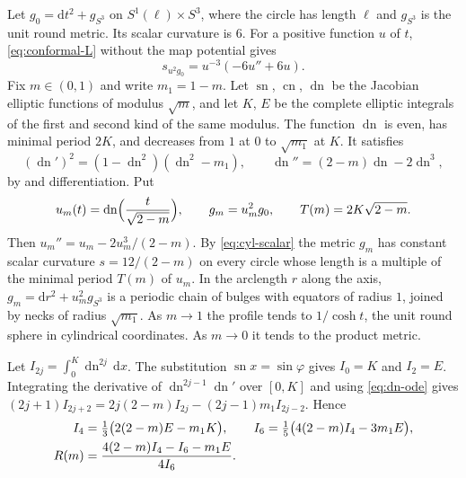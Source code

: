 \documentclass[11pt]{article}
\numberwithin{equation}{section}
\DeclareMathOperator{\sn}{sn}
\DeclareMathOperator{\cn}{cn}
\DeclareMathOperator{\dn}{dn}
\newcommand{\dd}{\mathrm{d}}
\begin{document}
Let \(g_0=\dd t^2+g_{S^3}\) on \(S^1(\ell)\times S^3\), where the circle
has length \(\ell\) and \(g_{S^3}\) is the unit round metric. Its
scalar curvature is \(6\). For a positive function \(u\) of \(t\),
\eqref{eq:conformal-L} without the map potential gives
\begin{equation}\label{eq:cyl-scalar}
 s_{u^2g_0}=u^{-3}(-6u''+6u).
\end{equation}
Fix \(m\in(0,1)\) and write \(m_1=1-m\). Let \(\sn\), \(\cn\), \(\dn\)
be the Jacobian elliptic functions of modulus \(\sqrt m\), and let
\(K\), \(E\) be the complete elliptic integrals of the first and second
kind of the same modulus. The function \(\dn\) is even, has minimal
period \(2K\), and decreases from \(1\) at \(0\) to \(\sqrt{m_1}\) at
\(K\). It satisfies
\begin{equation}\label{eq:dn-ode}
 (\dn')^2=(1-\dn^2)(\dn^2-m_1),\qquad
 \dn''=(2-m)\dn-2\dn^3 ,
\end{equation}
by \cite[(22.13.3)]{DLMF} and differentiation. Put
\begin{equation}\label{eq:delaunay}
 u_m(t)=\dn\Bigl(\frac{t}{\sqrt{2-m}}\Bigr),\qquad
 g_m=u_m^2g_0,\qquad T(m)=2K\sqrt{2-m}.
\end{equation}
Then \(u_m''=u_m-2u_m^3/(2-m)\). By \eqref{eq:cyl-scalar} the metric
\(g_m\) has constant scalar curvature \(s=12/(2-m)\) on every circle
whose length is a multiple of the minimal period \(T(m)\) of \(u_m\).
In the arclength \(r\) along the axis, \(g_m=\dd r^2+u_m^2g_{S^3}\) is
a periodic chain of bulges with equators of radius \(1\), joined by
necks of radius \(\sqrt{m_1}\). As \(m\to1\) the profile tends to
\(1/\cosh t\), the unit round sphere in cylindrical coordinates. As
\(m\to0\) it tends to the product metric.

Let \(I_{2j}=\int_0^K\dn^{2j}\,\dd x\). The substitution
\(\sn x=\sin\varphi\) gives \(I_0=K\) and \(I_2=E\). Integrating the
derivative of \(\dn^{2j-1}\dn'\) over \([0,K]\) and using
\eqref{eq:dn-ode} gives
\((2j+1)I_{2j+2}=2j(2-m)I_{2j}-(2j-1)m_1I_{2j-2}\). Hence
\begin{align}
 I_4&=\tfrac13\bigl(2(2-m)E-m_1K\bigr),\qquad
 I_6=\tfrac15\bigl(4(2-m)I_4-3m_1E\bigr),\notag\\
 R(m)&=\frac{4(2-m)I_4-I_6-m_1E}{4I_6}.
 \label{eq:I4I6}
\end{align}
\end{document}
